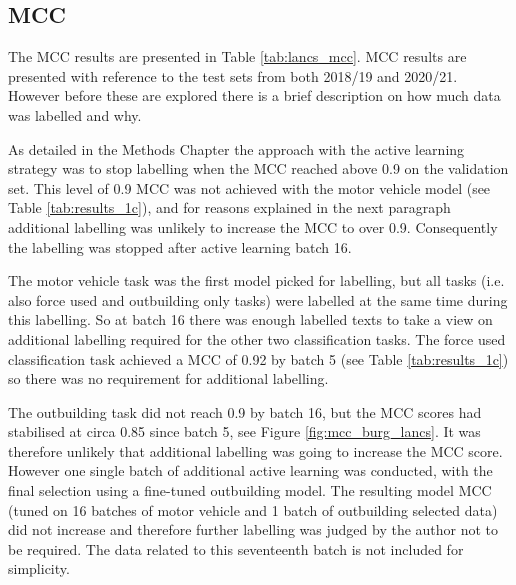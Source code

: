 \subsection{MCC} The MCC results are presented in Table \ref{tab:lancs_mcc}. MCC results are presented with reference to the test sets from both 2018/19 and 2020/21. However before these are explored there is a brief description on how much data was labelled and why.

 As detailed in the Methods Chapter the approach with the active learning strategy was to stop labelling when the MCC reached above 0.9 on the validation set. This level of 0.9 MCC was not achieved with the motor vehicle model (see Table \ref{tab:results_1c}), and for reasons explained in the next paragraph additional labelling was unlikely to increase the MCC to over 0.9.  Consequently the labelling was stopped after active learning batch 16.  

The motor vehicle task was the first model picked for labelling, but all tasks (i.e. also force used and outbuilding only tasks) were labelled at the same time  during this labelling. So at batch 16 there was enough labelled texts to take a view on additional labelling required for the other two classification tasks. The force used classification task achieved a MCC of 0.92 by batch 5 (see Table \ref{tab:results_1c}) so there was no requirement for additional labelling. 

The outbuilding task did not reach 0.9 by batch 16, but the MCC scores had stabilised at circa 0.85 since batch 5, see Figure \ref{fig:mcc_burg_lancs}. It was therefore unlikely that additional labelling was going to increase the MCC score. However one single batch of additional active learning was conducted, with the final selection using a fine-tuned outbuilding model. The resulting model MCC (tuned on 16 batches of motor vehicle and 1 batch of outbuilding selected data) did not increase and therefore further labelling was judged by the author not to be required. The data related to this seventeenth batch is not included for simplicity.

